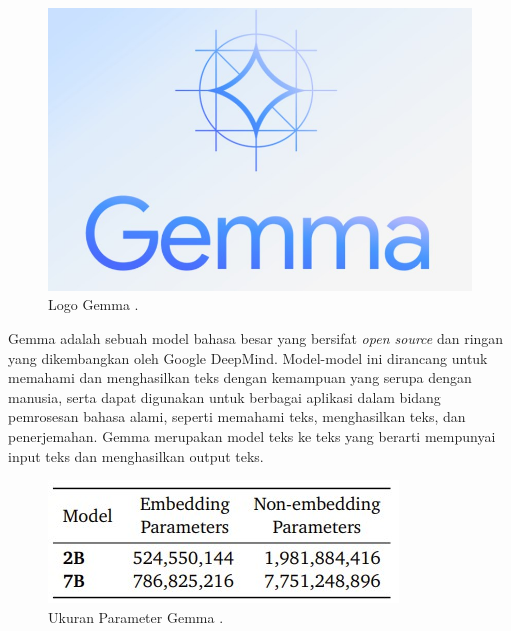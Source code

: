 \begin{figure}[H]
  \centering

  \includegraphics[scale=0.5]{gambar/gemma.jpg}

  \caption{Logo Gemma \parencite{gemma}.}
  \label{fig:roketluarangkasa}
\end{figure}

Gemma adalah sebuah model bahasa besar yang bersifat \emph{open source} dan ringan yang dikembangkan oleh Google DeepMind. Model-model ini dirancang untuk memahami dan menghasilkan teks dengan kemampuan yang serupa dengan manusia, serta dapat digunakan untuk berbagai aplikasi dalam bidang pemrosesan bahasa alami, seperti memahami teks, menghasilkan teks, dan penerjemahan. Gemma merupakan model teks ke teks yang berarti mempunyai input teks dan menghasilkan output teks.

\begin{figure}[H]
  \centering

  \includegraphics[scale=1]{gambar/param_gemma.jpg}

  \caption{Ukuran Parameter Gemma \parencite{gemma}.}
\end{figure}

